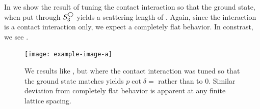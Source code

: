 In  we show the result of tuning the contact interaction so that the ground state, when put through $S^{\bigcirc}_3$ yields a scattering length of .
Again, since the interaction is a contact interaction only, we expect a completely flat behavior.
In constrast, we see .

\begin{figure}[th]
    \texttt{[image: example-image-a]}
    \caption{We results like , but where the contact interaction was tuned so that the ground state matches yields $p\cot\delta = $ rather than to 0.  Similar deviation from completely flat behavior is apparent at any finite lattice spacing.}
    \label{fig:finite a spherical}
\end{figure}
